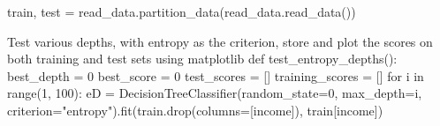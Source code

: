 \documentclass[
  letterpaper,
  DIV=11,
  numbers=noendperiod]{scrartcl}
\newenvironment{Shaded}{\begin{snugshade}}{\end{snugshade}}
\newcommand{\BuiltInTok}[1]{\textcolor[rgb]{0.00,0.23,0.31}{#1}}
\newcommand{\CommentTok}[1]{\textcolor[rgb]{0.37,0.37,0.37}{#1}}
\newcommand{\ControlFlowTok}[1]{\textcolor[rgb]{0.00,0.23,0.31}{#1}}
\newcommand{\DecValTok}[1]{\textcolor[rgb]{0.68,0.00,0.00}{#1}}
\newcommand{\KeywordTok}[1]{\textcolor[rgb]{0.00,0.23,0.31}{#1}}
\newcommand{\NormalTok}[1]{\textcolor[rgb]{0.00,0.23,0.31}{#1}}
\newcommand{\OperatorTok}[1]{\textcolor[rgb]{0.37,0.37,0.37}{#1}}
\newcommand{\StringTok}[1]{\textcolor[rgb]{0.13,0.47,0.30}{#1}}
\begin{document}
\begin{Shaded}
\begin{Highlighting}[]
\NormalTok{train, test }\OperatorTok{=}\NormalTok{ read\_data.partition\_data(read\_data.read\_data())}


\CommentTok{\textquotesingle{}\textquotesingle{}\textquotesingle{}Test various depths, with entropy as the criterion, }
\CommentTok{store and plot the scores on both training and test sets using matplotlib\textquotesingle{}\textquotesingle{}\textquotesingle{}}
\KeywordTok{def}\NormalTok{ test\_entropy\_depths():}
\NormalTok{    best\_depth }\OperatorTok{=} \DecValTok{0}
\NormalTok{    best\_score }\OperatorTok{=} \DecValTok{0}
\NormalTok{    test\_scores }\OperatorTok{=}\NormalTok{ []}
\NormalTok{    training\_scores }\OperatorTok{=}\NormalTok{ []}
    \ControlFlowTok{for}\NormalTok{ i }\KeywordTok{in} \BuiltInTok{range}\NormalTok{(}\DecValTok{1}\NormalTok{, }\DecValTok{100}\NormalTok{):}
\NormalTok{        eD }\OperatorTok{=}\NormalTok{ DecisionTreeClassifier(random\_state}\OperatorTok{=}\DecValTok{0}\NormalTok{, max\_depth}\OperatorTok{=}\NormalTok{i,}
\NormalTok{         criterion}\OperatorTok{=}\StringTok{"entropy"}\NormalTok{).fit(train.drop(columns}\OperatorTok{=}\NormalTok{[}\StringTok{\textquotesingle{}income\textquotesingle{}}\NormalTok{]), }
\NormalTok{         train[}\StringTok{\textquotesingle{}income\textquotesingle{}}\NormalTok{])}



\end{Highlighting}
\end{Shaded}
\end{document}
